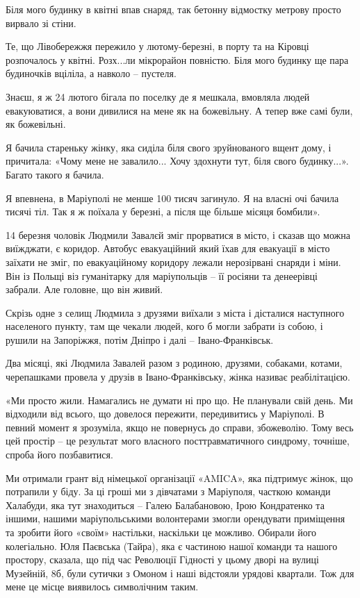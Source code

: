 Біля мого будинку в квітні впав снаряд, так бетонну відмостку метрову просто
вирвало зі стіни.

Те, що Лівобережжя пережило у лютому-березні, в порту та на Кіровці розпочалось
у квітні. Розх...ли мікрорайон повністю. Біля мого будинку ще пара будиночків
вціліла, а навколо – пустеля.

Знаєш, я ж 24 лютого бігала по поселку де я мешкала, вмовляла людей
евакуюватися, а вони дивилися на мене як на божевільну. А тепер вже самі були,
як божевільні.

Я бачила стареньку жінку, яка сиділа біля свого зруйнованого вщент дому, і
причитала: «Чому мене не завалило... Хочу здохнути тут, біля свого будинку...».
Багато такого я бачила.

Я впевнена, в Маріуполі не менше 100 тисяч загинуло. Я на власні очі бачила
тисячі тіл. Так я ж поїхала у березні, а після ще більше місяця бомбили».

14 березня чоловік Людмили Завалєй зміг прорватися в місто, і сказав що можна
виїжджати, є коридор.  Автобус евакуаційний який їхав для евакуації в місто
заїхати не зміг, по евакуаційному коридору лежали нерозірвані снаряди і міни.
Він із Польщі віз гуманітарку для маріупольців  – її росіяни та денеерівці
забрали. Але головне, що він живий.

Скрізь одне з селищ Людмила з друзями виїхали з міста і дісталися наступного
населеного пункту, там ще чекали людей, кого б могли забрати із собою, і рушили
на Запоріжжя, потім Дніпро і далі – Івано-Франківськ. 

Два місяці, які Людмила Завалей разом з родиною, друзями, собаками, котами,
черепашками провела у друзів в Івано-Франківську, жінка називає реабілітацією.

«Ми просто жили. Намагались не думати ні про що. Не планували свій день. Ми
відходили від всього, що довелося пережити, передивитись у Маріуполі. В певний
момент я зрозуміла, якщо не повернусь до справи, збожеволію. Тому весь цей
простір – це результат мого власного посттравматичного синдрому, точніше,
спроба його позбавитися.

Ми отримали грант від німецької організації «AMICA», яка підтримує жінок, що
потрапили у біду. За ці гроші ми з дівчатами з Маріуполя, часткою команди
Халабуди, яка тут знаходиться – Галею Балабановою, Ірою Кондратенко та іншими,
нашими маріупольськими волонтерами змогли орендувати приміщення та зробити його
«своїм» настільки, наскільки це можливо. Обирали його колегіально. Юля Паєвська
(Тайра), яка є частиною нашої команди та нашого простору, сказала, що під час
Революції Гідності у цьому дворі на вулиці Музейній, 8б,  були сутички з Омоном
і наші відстояли урядові квартали. Тож для мене це місце виявилось символічним
таким.

